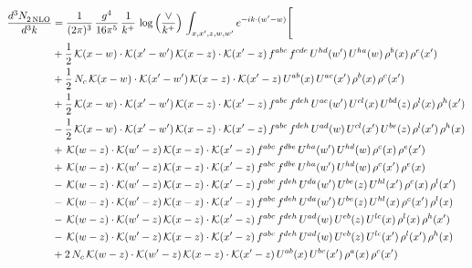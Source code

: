\documentclass[9pt]{article}
\numberwithin{equation}{section}
\begin{document}
\begin{align}
    \frac{d^{3}N_{2\,\rm NLO}^{\rm}}{d^{3}k}  & = \frac{1}{(2\pi)^{3}}\,\frac{g^{4}}{16\pi^{5}}\,\frac{1}{k^{+}}\,\log{\left(\frac{\vee}{k^{+}}\right)}\, \int_{x,x',z,w,w'}e^{-ik\cdot(w'-w)}\Bigg[\notag\\ & +\frac{1}{2}\,\mathcal{K}(x-w)\cdot\mathcal{K}(x'-w')\,\mathcal{K}(x-z)\cdot\mathcal{K}(x'-z)\,f^{abc}\,f^{cde}\,U^{hd}(w')\,U^{ha}(w)\,\rho^{b}(x)\,\rho^{e}(x')\notag \\ 
&+\frac{1}{2}\,N_{c}\,\mathcal{K}(x-w)\cdot\mathcal{K}(x'-w')\,\mathcal{K}(x-z)\cdot\mathcal{K}(x'-z)\,U^{ab}(x)\,U^{ac}(x')\,\rho^{b}(x)\,\rho^{c}(x')\notag \\ 
&+\frac{1}{2}\,\mathcal{K}(x-w)\cdot\mathcal{K}(x'-w')\,\mathcal{K}(x-z)\cdot\mathcal{K}(x'-z)\,f^{abc}\,f^{deh}\,U^{ae}(w')\,U^{cl}(x)\,U^{bd}(z)\,\rho^{l}(x)\,\rho^{h}(x')\notag \\ 
&-\frac{1}{2}\,\mathcal{K}(x-w)\cdot\mathcal{K}(x'-w')\,\mathcal{K}(x-z)\cdot\mathcal{K}(x'-z)\,f^{abc}\,f^{deh}\,U^{ad}(w)\,U^{cl}(x')\,U^{be}(z)\,\rho^{l}(x')\,\rho^{h}(x)\notag \\ 
&+\,\mathcal{K}(w-z)\cdot\mathcal{K}(w'-z)\,\mathcal{K}(x-z)\cdot\mathcal{K}(x'-z)\,f^{abc}\,f^{dbe}\,U^{ha}(w')\,U^{hd}(w)\,\rho^{c}(x)\,\rho^{e}(x')\notag \\ 
&+\,\mathcal{K}(w-z)\cdot\mathcal{K}(w'-z)\,\mathcal{K}(x-z)\cdot\mathcal{K}(x'-z)\,f^{abc}\,f^{dbe}\,U^{ha}(w')\,U^{hd}(w)\,\rho^{c}(x')\,\rho^{e}(x)\notag \\ 
&-\,\mathcal{K}(w-z)\cdot\mathcal{K}(w'-z)\,\mathcal{K}(x-z)\cdot\mathcal{K}(x'-z)\,f^{abc}\,f^{deh}\,U^{da}(w')\,U^{be}(z)\,U^{hl}(x')\,\rho^{c}(x)\,\rho^{l}(x')\notag \\ 
&-\,\mathcal{K}(w-z)\cdot\mathcal{K}(w'-z)\,\mathcal{K}(x-z)\cdot\mathcal{K}(x'-z)\,f^{abc}\,f^{deh}\,U^{da}(w')\,U^{be}(z)\,U^{hl}(x)\,\rho^{c}(x')\,\rho^{l}(x)\notag \\ 
&-\,\mathcal{K}(w-z)\cdot\mathcal{K}(w'-z)\,\mathcal{K}(x-z)\cdot\mathcal{K}(x'-z)\,f^{abc}\,f^{deh}\,U^{ad}(w)\,U^{eb}(z)\,U^{lc}(x)\,\rho^{l}(x)\,\rho^{h}(x')\notag \\ 
&-\,\mathcal{K}(w-z)\cdot\mathcal{K}(w'-z)\,\mathcal{K}(x-z)\cdot\mathcal{K}(x'-z)\,f^{abc}\,f^{deh}\,U^{ad}(w)\,U^{eb}(z)\,U^{lc}(x')\,\rho^{l}(x')\,\rho^{h}(x)\notag \\ 
&+2\,N_{c}\,\mathcal{K}(w-z)\cdot\mathcal{K}(w'-z)\,\mathcal{K}(x-z)\cdot\mathcal{K}(x'-z)\,U^{ab}(x)\,U^{bc}(x')\,\rho^{a}(x)\,\rho^{c}(x')\notag \\ 

\end{align}
\end{document}
